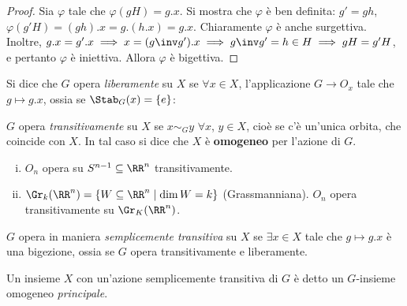 \documentclass[11pt]{article}
\begin{document}
	\begin{proof}
		Sia $\varphi$ tale che $\varphi(gH) = g.x$. Si mostra che
		$\varphi$ è ben definita: $g' = gh$, $\varphi(g'H) = (gh).x =
		g.(h.x) = g.x$. Chiaramente $\varphi$ è anche surgettiva.
		Inoltre, $g.x = g'.x \implies x = (g\inv g').x \implies g\inv g' = h \in H \implies gH = g'H$, e pertanto $\varphi$ è iniettiva.
		Allora $\varphi$ è bigettiva.
	\end{proof}

	\begin{definition}
		Si dice che $G$ opera \textit{liberamente} su $X$ se
		$\forall x \in X$, l'applicazione $G \to O_x$ tale che
		$g \mapsto g.x$, ossia se $\Stab_G(x) = \{e\}$:
	\end{definition}
	
	\begin{definition}
		$G$ opera \textit{transitivamente} su $X$ se $x \sim_G y$ $\forall x$, $y \in X$, cioè se c'è un'unica orbita, che coincide con $X$. In
		tal caso si dice che $X$ è \textbf{omogeneo} per l'azione di $G$.
	\end{definition}

	\begin{example}
		\begin{enumerate}[(i)]
			\item $O_n$ opera su $S^{n-1} \subseteq \RR^n$ transitivamente.
			
			\item $\Gr_k(\RR^n) = \{ W \subseteq \RR^n \mid \dim W = k \}$ (Grassmanniana). $O_n$ opera transitivamente su $\Gr_K(\RR^n)$.
		\end{enumerate}
	\end{example}

	\begin{definition}
		$G$ opera in maniera \textit{semplicemente transitiva} su $X$
		se $\exists x \in X$ tale che $g \mapsto g.x$ è una bigezione,
		ossia se $G$ opera transitivamente e liberamente.
	\end{definition}

	\begin{definition}
		Un insieme $X$ con un'azione semplicemente transitiva di $G$ è
		detto un $G$-insieme omogeneo \textit{principale}.
	\end{definition}
\end{document}
